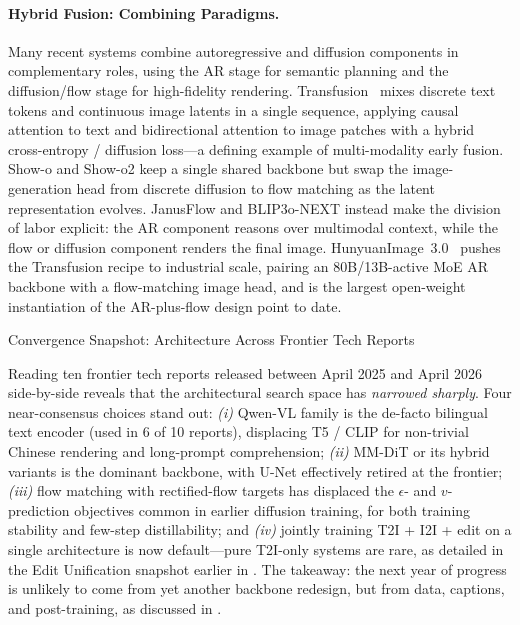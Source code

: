 \paragraph{Hybrid Fusion: Combining Paradigms.}
Many recent systems combine autoregressive and diffusion components in complementary roles, using the AR stage for semantic planning and the diffusion/flow stage for high-fidelity rendering. Transfusion~\citep{zhou2024transfusion} mixes discrete text tokens and continuous image latents in a single sequence, applying causal attention to text and bidirectional attention to image patches with a hybrid cross-entropy / diffusion loss---a defining example of multi-modality early fusion. Show-o and Show-o2 keep a single shared backbone but swap the image-generation head from discrete diffusion to flow matching as the latent representation evolves. JanusFlow and BLIP3o-NEXT instead make the division of labor explicit: the AR component reasons over multimodal context, while the flow or diffusion component renders the final image. HunyuanImage~3.0~\citep{cao2025hunyuanimage} pushes the Transfusion recipe to industrial scale, pairing an 80B/13B-active MoE AR backbone with a flow-matching image head, and is the largest open-weight instantiation of the AR-plus-flow design point to date.


\begin{highlightbox}{Convergence Snapshot: Architecture Across Frontier Tech Reports}

Reading ten frontier tech reports released between April 2025 and April 2026 side-by-side reveals that the architectural search space has \emph{narrowed sharply}. Four near-consensus choices stand out: \emph{(i)} Qwen-VL family is the de-facto bilingual text encoder (used in 6 of 10 reports), displacing T5 / CLIP for non-trivial Chinese rendering and long-prompt comprehension; \emph{(ii)} MM-DiT or its hybrid variants is the dominant backbone, with U-Net effectively retired at the frontier; \emph{(iii)} flow matching with rectified-flow targets has displaced the $\epsilon$- and $v$-prediction objectives common in earlier diffusion training, for both training stability and few-step distillability; and \emph{(iv)} jointly training T2I + I2I + edit on a single architecture is now default---pure T2I-only systems are rare, as detailed in the Edit Unification snapshot earlier in . The takeaway: the next year of progress is unlikely to come from yet another backbone redesign, but from data, captions, and post-training, as discussed in .
\end{highlightbox}


